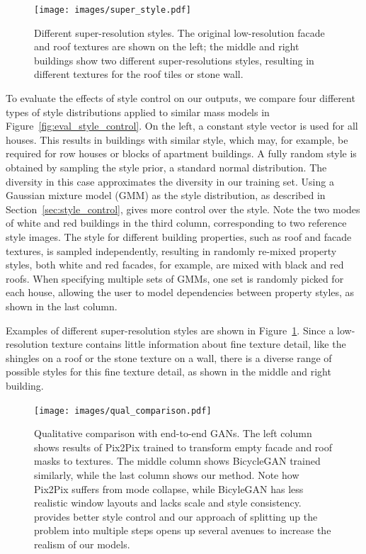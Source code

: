 \begin{figure}[b]
    \centering
    \texttt{[image: images/super\_style.pdf]}
    \caption{Different super-resolution styles. The original low-resolution facade and roof textures are shown on the left; the middle and right buildings show two different super-resolutions styles, resulting in different textures for the roof tiles or stone wall.}
    \label{fig:super_style}
\end{figure}

To evaluate the effects of style control on our outputs, we compare four different types of style distributions applied to similar mass models in Figure~\ref{fig:eval_style_control}. On the left, a constant style vector is used for all houses. This results in buildings with similar style, which may, for example, be required for row houses or blocks of apartment buildings. A fully random style is obtained by sampling the style prior, a standard normal distribution. The diversity in this case approximates the diversity in our training set. Using a Gaussian mixture model (GMM) as the style distribution, as described in Section~\ref{sec:style_control}, gives more control over the style. Note the two modes of white and red buildings in the third column, corresponding to two reference style images. The style for different building properties, such as roof and facade textures, is sampled independently, resulting in randomly re-mixed property styles, both white and red facades, for example, are mixed with black and red roofs. When specifying multiple sets of GMMs, one set is randomly picked for each house, allowing the user to model dependencies between property styles, as shown in the last column.

Examples of different super-resolution styles are shown in Figure~\ref{fig:super_style}. Since a low-resolution texture contains little information about fine texture detail, like the shingles on a roof or the stone texture on a wall, there is a diverse range of possible styles for this fine texture detail, as shown in the middle and right building.

\begin{figure}[t]
    \centering
    \texttt{[image: images/qual\_comparison.pdf]}
    \caption{Qualitative comparison with end-to-end GANs. The left column shows results of Pix2Pix trained to transform empty facade and roof masks to textures. The middle column shows BicycleGAN trained similarly, while the last column shows our method. Note how Pix2Pix suffers from mode collapse, while BicyleGAN has less realistic window layouts and lacks scale and style consistency. \systemName provides better style control and our approach of splitting up the problem into multiple steps opens up several avenues to increase the realism of our models.}
    \label{fig:qual_comparison}
\end{figure}

